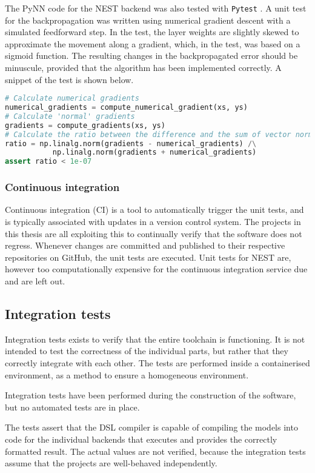 The PyNN code for the NEST backend was also tested with \texttt{Pytest}
\cite{Pytest2018}.
A unit test for the backpropagation was written using numerical gradient descent
with a simulated feedforward step.
In the test, the layer weights are slightly skewed to approximate the movement
along a gradient, which, in the test, was based on a sigmoid function.
The resulting changes in the backpropagated error should be minuscule, provided
that the algorithm has been implemented correctly.
A snippet of the test is shown below.

\begin{minipage}{\linewidth}
\begin{lstlisting}[language=Python,label={lst:volrpynn_numerical},caption={Part
of the numerical gradient test for the densely connected layer in PyNN.}]
# Calculate numerical gradients
numerical_gradients = compute_numerical_gradient(xs, ys)
# Calculate 'normal' gradients
gradients = compute_gradients(xs, ys)
# Calculate the ratio between the difference and the sum of vector norms
ratio = np.linalg.norm(gradients - numerical_gradients) /\
           np.linalg.norm(gradients + numerical_gradients)
assert ratio < 1e-07
\end{lstlisting}
\end{minipage}

\subsubsection{Continuous integration}
Continuous integration (CI) is a tool to automatically trigger the unit tests, and is
typically associated with updates in a version control system. \index{Continuous
integration}
The projects in this thesis are all exploiting this to continually verify that
the software does not regress.
Whenever changes are committed and published to their respective repositories on
GitHub, the unit tests are executed.
Unit tests for NEST are, however too computationally expensive for the
continuous integration service due and are left out.

\subsection{Integration tests}
Integration tests exists to verify that the entire toolchain is functioning.
It is not intended to test the correctness of the individual parts, but rather
that they correctly integrate with each other.
The tests are performed inside a containerised environment, as a
method to ensure a homogeneous environment. 

Integration tests have been performed during the construction of the software,
but no automated tests are in place.

The tests assert that the \gls{DSL} compiler is capable of compiling the models
into code for the individual backends that executes and provides the correctly
formatted result.
The actual values are not verified, because the integration tests assume that
the projects are well-behaved independently.
